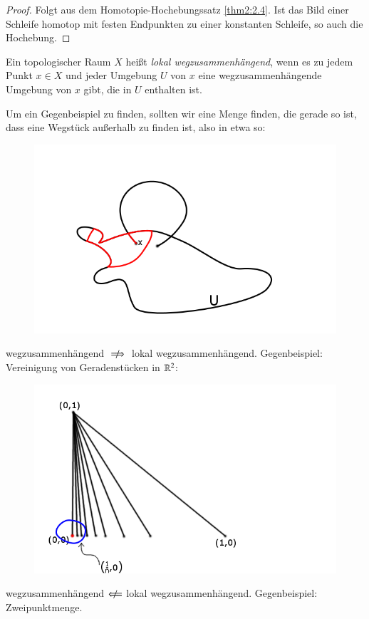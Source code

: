 \documentclass[a4paper,10pt]{scrartcl}
\begin{document}
\begin{proof}
 Folgt aus dem Homotopie-Hochebungssatz \ref{thm2:2.4}. Ist das Bild einer Schleife homotop mit festen Endpunkten zu einer konstanten Schleife, so auch die Hochebung.
\end{proof}
\begin{df}
 Ein topologischer Raum $X$ heißt \emph{lokal wegzusammenhängend}, wenn es zu jedem Punkt $x\in X$ und jeder Umgebung $U$ von $x$ eine wegzusammenhängende Umgebung von $x$ gibt, die in $U$ enthalten ist. 
\end{df}
\begin{note*}
Um ein Gegenbeispiel zu finden, sollten wir eine Menge finden, die gerade so ist, dass eine Wegstück außerhalb zu finden ist, also in etwa so:
\begin{figure}[H]
\centering
 \includegraphics[scale=0.3]{fig81.png}
 \caption{}
\end{figure}
 wegzusammenhängend $\centernot \implies$  lokal wegzusammenhängend.  Gegenbeispiel: Vereinigung von Geradenstücken in $\mathbb{R}^2$:\\
\begin{figure}[H]
\centering
 \includegraphics[scale=0.3]{fig82.png}
 \caption{}
\end{figure}

 wegzusammenhängend $\nimplies$ lokal wegzusammenhängend. Gegenbeispiel: Zweipunktmenge.
\end{note*}
\end{document}
